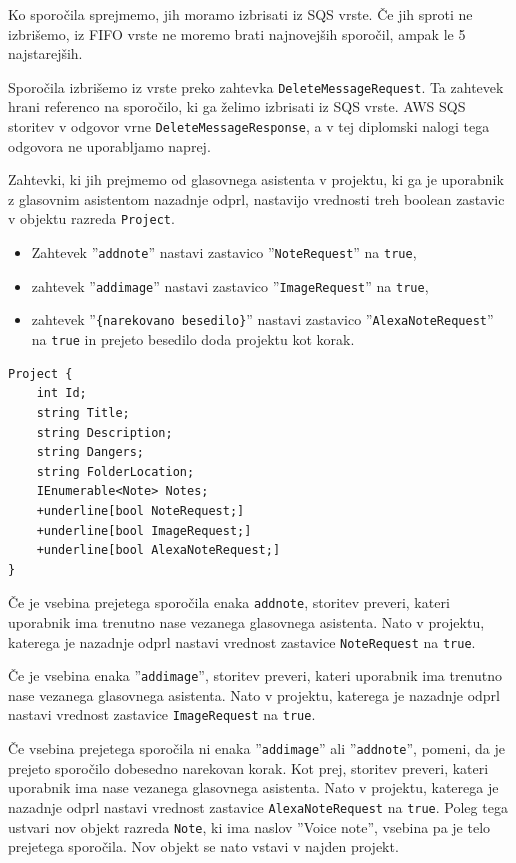\documentclass[a4paper, 12pt]{book}
\begin{document}
Ko sporočila sprejmemo, jih moramo izbrisati iz SQS vrste.
Če jih sproti ne izbrišemo, iz FIFO vrste ne moremo brati najnovejših sporočil, ampak le 5 najstarejših.

Sporočila izbrišemo iz vrste preko zahtevka \texttt{DeleteMessageRequest}.
Ta zahtevek hrani referenco na sporočilo, ki ga želimo izbrisati iz SQS vrste.
AWS SQS storitev v odgovor vrne \texttt{DeleteMessageResponse}, a v tej diplomski nalogi tega odgovora ne uporabljamo naprej.

Zahtevki, ki jih prejmemo od glasovnega asistenta v projektu, ki ga je uporabnik z glasovnim asistentom nazadnje odprl, nastavijo vrednosti treh boolean zastavic v objektu razreda \texttt{Project}.
\begin{itemize}
	\item Zahtevek ''\texttt{addnote}'' nastavi zastavico ''\texttt{NoteRequest}'' na \texttt{true},
	\item zahtevek ''\texttt{addimage}'' nastavi zastavico ''\texttt{ImageRequest}'' na \texttt{true},
	\item zahtevek ''\texttt{\{narekovano besedilo\}}'' nastavi zastavico ''\texttt{AlexaNoteRequest}'' na \texttt{true} in prejeto besedilo doda projektu kot korak.
\end{itemize}

\begin{Verbatim}[commandchars=+\[\]]
Project { 
    int Id; 
    string Title; 
    string Description; 
    string Dangers; 
    string FolderLocation; 
    IEnumerable<Note> Notes; 
    +underline[bool NoteRequest;] 
    +underline[bool ImageRequest;] 
    +underline[bool AlexaNoteRequest;] 
}
\end{Verbatim}


Če je vsebina prejetega sporočila enaka \texttt{addnote}, storitev preveri, kateri uporabnik ima trenutno nase vezanega glasovnega asistenta.
Nato v projektu, katerega je nazadnje odprl nastavi vrednost zastavice \texttt{NoteRequest} na \texttt{true}.


Če je vsebina enaka ''\texttt{addimage}'', storitev preveri, kateri uporabnik ima trenutno nase vezanega glasovnega asistenta.
Nato v projektu, katerega je nazadnje odprl nastavi vrednost zastavice \texttt{ImageRequest} na \texttt{true}.

Če vsebina prejetega sporočila ni enaka ''\texttt{addimage}'' ali ''\texttt{addnote}'', pomeni, da je prejeto sporočilo dobesedno narekovan korak.
Kot prej, storitev preveri, kateri uporabnik ima nase vezanega glasovnega asistenta.
Nato v projektu, katerega je nazadnje odprl nastavi vrednost zastavice \texttt{AlexaNoteRequest} na \texttt{true}.
Poleg tega ustvari nov objekt razreda \texttt{Note}, ki ima naslov ''Voice note'', vsebina pa je telo prejetega sporočila.
Nov objekt se nato vstavi v najden projekt.
\end{document}
